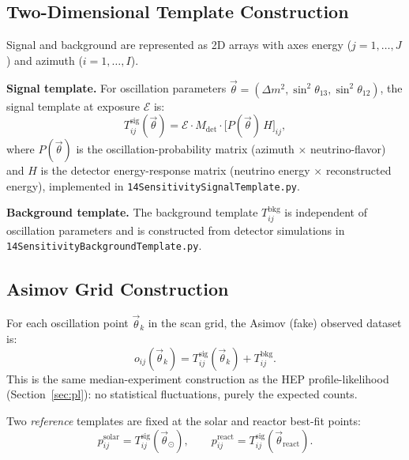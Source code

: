 \documentclass[12pt,a4paper]{article}
\newcommand{\Tsig}{T^{\mathrm{sig}}}
\newcommand{\Tbkg}{T^{\mathrm{bkg}}}
\begin{document}
\subsection{Two-Dimensional Template Construction}
\label{sec:sens_templates}

Signal and background are represented as 2D arrays with axes
energy ($j=1,\ldots,J$) and azimuth ($i=1,\ldots,I$).

\medskip
\noindent\textbf{Signal template.}
For oscillation parameters $\vec{\theta} = (\Delta m^2,\sin^2\theta_{13},\sin^2\theta_{12})$,
the signal template at exposure $\mathcal{E}$ is:
\begin{equation}
  \Tsig_{ij}(\vec{\theta}) = \mathcal{E}\cdot M_{\mathrm{det}}
    \cdot \bigl[P(\vec{\theta})\,H\bigr]_{ij},
  \label{eq:signal_template}
\end{equation}
where $P(\vec{\theta})$ is the oscillation-probability matrix
(azimuth $\times$ neutrino-flavor) and $H$ is the detector energy-response
matrix (neutrino energy $\times$ reconstructed energy), implemented in
\texttt{14SensitivitySignalTemplate.py}.

\medskip
\noindent\textbf{Background template.}
The background template $\Tbkg_{ij}$ is independent of oscillation parameters
and is constructed from detector simulations in
\texttt{14SensitivityBackgroundTemplate.py}.

\subsection{Asimov Grid Construction}
\label{sec:sens_asimov}

For each oscillation point $\vec{\theta}_k$ in the scan grid,
the Asimov (fake) observed dataset is:
\begin{equation}
  o_{ij}(\vec{\theta}_k) = \Tsig_{ij}(\vec{\theta}_k) + \Tbkg_{ij}.
  \label{eq:sens_asimov}
\end{equation}
This is the same median-experiment construction as the HEP profile-likelihood
(Section~\ref{sec:pl}): no statistical fluctuations, purely the expected counts.

Two \emph{reference} templates are fixed at the solar and reactor best-fit points:
\begin{equation}
  p^{\mathrm{solar}}_{ij} = \Tsig_{ij}(\vec{\theta}_{\odot}),
  \qquad
  p^{\mathrm{react}}_{ij} = \Tsig_{ij}(\vec{\theta}_{\mathrm{react}}).
  \label{eq:reference_templates}
\end{equation}
\end{document}
